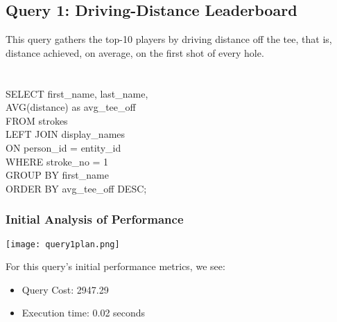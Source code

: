\documentclass[titlepage]{article}
\begin{document}
\subsection{Query 1: Driving-Distance Leaderboard}
\vspace{1em}
This query gathers the top-10 players by driving distance off the tee, that is, distance achieved, on average, on the
first shot of every hole. \\ \\ \\
\hspace{15pt}SELECT first\_name, last\_name, \\
\hspace{15pt}AVG(distance) as avg\_tee\_off \\
\hspace{15pt}FROM strokes \\
\hspace{15pt}LEFT JOIN display\_names \\
\hspace{15pt}ON person\_id = entity\_id \\
\hspace{15pt}WHERE stroke\_no = 1 \\
\hspace{15pt}GROUP BY first\_name \\
\hspace{15pt}ORDER BY avg\_tee\_off DESC; \\

\vspace{1em}

\subsubsection{Initial Analysis of Performance}
\vspace{1em}
\begin{center}
  \texttt{[image: query1plan.png]}
\end{center}
\vspace{1em}
For this query's initial performance metrics, we see:
\begin{itemize}
  \item Query Cost: 2947.29
  \item Execution time: 0.02 seconds
\end{itemize}
\vspace{1em}
\end{document}
